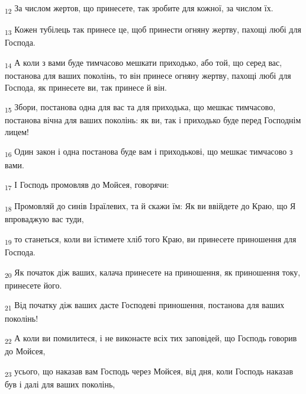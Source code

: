 \begin{tcolorbox}
\textsubscript{12} За числом жертов, що принесете, так зробите для кожної, за числом їх.
\end{tcolorbox}
\begin{tcolorbox}
\textsubscript{13} Кожен тубілець так принесе це, щоб принести огняну жертву, пахощі любі для Господа.
\end{tcolorbox}
\begin{tcolorbox}
\textsubscript{14} А коли з вами буде тимчасово мешкати приходько, або той, що серед вас, постанова для ваших поколінь, то він принесе огняну жертву, пахощі любі для Господа, як принесете ви, так принесе й він.
\end{tcolorbox}
\begin{tcolorbox}
\textsubscript{15} Збори, постанова одна для вас та для приходька, що мешкає тимчасово, постанова вічна для ваших поколінь: як ви, так і приходько буде перед Господнім лицем!
\end{tcolorbox}
\begin{tcolorbox}
\textsubscript{16} Один закон і одна постанова буде вам і приходькові, що мешкає тимчасово з вами.
\end{tcolorbox}
\begin{tcolorbox}
\textsubscript{17} І Господь промовляв до Мойсея, говорячи:
\end{tcolorbox}
\begin{tcolorbox}
\textsubscript{18} Промовляй до синів Ізраїлевих, та й скажи їм: Як ви ввійдете до Краю, що Я впроваджую вас туди,
\end{tcolorbox}
\begin{tcolorbox}
\textsubscript{19} то станеться, коли ви їстимете хліб того Краю, ви принесете приношення для Господа.
\end{tcolorbox}
\begin{tcolorbox}
\textsubscript{20} Як початок діж ваших, калача принесете на приношення, як приношення току, принесете його.
\end{tcolorbox}
\begin{tcolorbox}
\textsubscript{21} Від початку діж ваших дасте Господеві приношення, постанова для ваших поколінь!
\end{tcolorbox}
\begin{tcolorbox}
\textsubscript{22} А коли ви помилитеся, і не виконаєте всіх тих заповідей, що Господь говорив до Мойсея,
\end{tcolorbox}
\begin{tcolorbox}
\textsubscript{23} усього, що наказав вам Господь через Мойсея, від дня, коли Господь наказав був і далі для ваших поколінь,
\end{tcolorbox}
